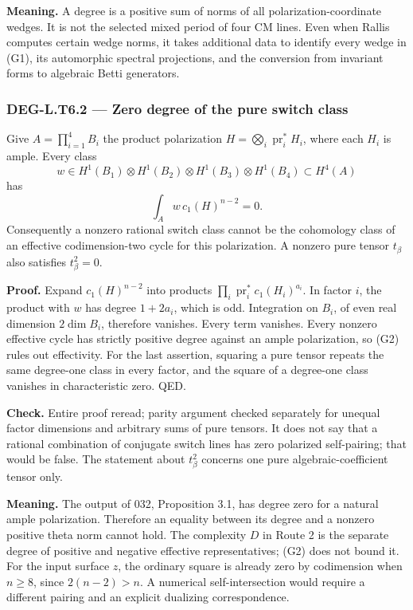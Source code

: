 \textbf{Meaning.} A degree is a positive sum of norms of all polarization-coordinate wedges. It is not the selected mixed period of four CM lines. Even when Rallis computes certain wedge norms, it takes additional data to identify every wedge in (G1), its automorphic spectral projections, and the conversion from invariant forms to algebraic Betti generators.

\subsubsection{DEG-L.T6.2 --- Zero degree of the pure switch class}\label{DEG-L.T6.2}

Give \(A=\prod_{i=1}^4B_i\) the product polarization \(H=\bigotimes_i\operatorname{pr}_i^*H_i\), where each \(H_i\) is ample. Every class \[
w\in H^1(B_1)\otimes H^1(B_2)\otimes H^1(B_3)\otimes H^1(B_4)\subset H^4(A)
\] has \[
\int_A w\,c_1(H)^{n-2}=0.
\tag{G2}
\] Consequently a nonzero rational switch class cannot be the cohomology class of an effective codimension-two cycle for this polarization. A nonzero pure tensor \(t_\beta\) also satisfies \(t_\beta^2=0\).

\textbf{Proof.} Expand \(c_1(H)^{n-2}\) into products \(\prod_i\operatorname{pr}_i^*c_1(H_i)^{a_i}\). In factor \(i\), the product with \(w\) has degree \(1+2a_i\), which is odd. Integration on \(B_i\), of even real dimension \(2\dim B_i\), therefore vanishes. Every term vanishes. Every nonzero effective cycle has strictly positive degree against an ample polarization, so (G2) rules out effectivity. For the last assertion, squaring a pure tensor repeats the same degree-one class in every factor, and the square of a degree-one class vanishes in characteristic zero. QED.

\textbf{Check.} Entire proof reread; parity argument checked separately for unequal factor dimensions and arbitrary sums of pure tensors. It does not say that a rational combination of conjugate switch lines has zero polarized self-pairing; that would be false. The statement about \(t_\beta^2\) concerns one pure algebraic-coefficient tensor only.

\textbf{Meaning.} The output of 032, Proposition 3.1, has degree zero for a natural ample polarization. Therefore an equality between its degree and a nonzero positive theta norm cannot hold. The complexity \(D\) in Route 2 is the separate degree of positive and negative effective representatives; (G2) does not bound it. For the input surface \(z\), the ordinary square is already zero by codimension when \(n\ge8\), since \(2(n-2)>n\). A numerical self-intersection would require a different pairing and an explicit dualizing correspondence.

